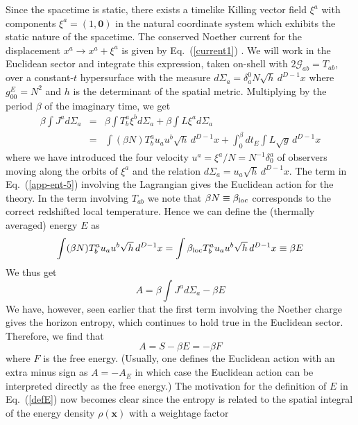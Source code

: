 \documentclass[12pt]{iopart}
\def\eq#1{{Eq.~(\ref{#1})}}
\begin{document}
Since the spacetime is static, there exists a timelike Killing vector field $\xi^a$ with components $\xi^a = (1,\mathbf{0})$ in the natural coordinate system which exhibits the static nature of the spacetime. The conserved Noether current for the displacement $x^a \to x^a + \xi^a$ is given by \eq{current1} . We will work in the Euclidean sector and integrate this expression, taken on-shell with $2\mathcal{G}_{ab}=T_{ab}$, over a constant-$t$ hypersurface with the measure $d\Sigma_a = \delta_a^0 N\sqrt{h}\, d^{D-1} x$
where $g^{E}_{00} = N^2$ and $h$ is the determinant of the spatial metric. Multiplying by
the period $\beta$ of the imaginary time, we get
\begin{eqnarray}
\beta \int J^a d \Sigma_a 
&=& \beta \int T^a_b \xi^b d\Sigma_a  + \beta \int L \xi^a d \Sigma_a\nonumber\\
&=& \int  (\beta  N) T^a_b u_au^b \sqrt{h}\, d^{D-1}x  + \int_0^\beta dt_E \int L \sqrt{g}\, d^{D-1}x
\label{useja}
\end{eqnarray} 
where we have introduced the four velocity  $u^a = \xi^a/N = N^{-1}\delta^a_0$
of observers moving along the orbits of $\xi^a$ and the relation $d\Sigma_a = u_a\sqrt{h}\, d^{D-1} x$.  The term  in \eq{app-ent-5} involving the Lagrangian gives the Euclidean action
for the theory. In the term involving $T_{ab}$ we note that $\beta N \equiv \beta_{\rm loc}$ corresponds to the correct redshifted local temperature.
Hence we can define the (thermally averaged) energy $E$ as
\begin{equation}
\int  (\beta  N) T^a_b u_au^b \sqrt{h}\, d^{D-1}x =
\int  \beta_{\rm loc}   T^a_b u_au^b \sqrt{h}\, d^{D-1}x \equiv 
\beta E
\label{defE}
\end{equation} 
We thus get 
\begin{equation}
A= \beta \int J^a d \Sigma_a -\beta E
\end{equation} 
We have, however, seen earlier that the first term involving the Noether charge
gives the horizon entropy, which continues to hold true in the Euclidean sector.
Therefore, we find that 
\begin{equation}
A= S- \beta E = -\beta F 
\end{equation} 
where $F$ is the free energy.  (Usually, one defines the Euclidean action with an extra minus sign as $A=-A_E$ in which case the Euclidean action can be interpreted directly as the free energy.) The motivation for the definition of $E$ in \eq{defE}
now becomes clear since the entropy is related to the spatial integral of the energy density $\rho(\mathbf{x})$ with a weightage factor 
\end{document}
